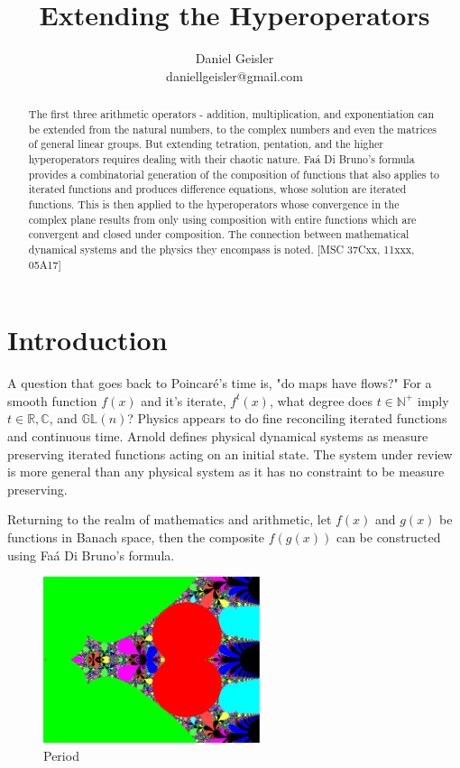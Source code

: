 \documentclass{article}
\theoremstyle{definition}
\begin{document}
\title{Extending the Hyperoperators}

\author{Daniel Geisler\\               %
daniellgeisler@gmail.com}                    

\maketitle

\begin{abstract}
  The first three arithmetic operators - addition, multiplication, and exponentiation can be extended from the natural numbers, to the complex numbers and even the matrices of general linear groups. But extending tetration, pentation, and the higher hyperoperators requires dealing with their chaotic nature. Fa\'a Di Bruno's formula provides a combinatorial generation of the composition of functions that also applies to iterated functions and produces difference equations, whose solution are iterated functions. This is then applied to the hyperoperators whose convergence in the complex plane results from only using composition with entire functions which are convergent and closed under composition. The connection between mathematical dynamical systems and the physics they encompass is noted. [MSC 37Cxx, 11xxx, 05A17]
\end{abstract}

\section{Introduction}
A question that goes back to Poincar\'e's time is, "do maps have flows?" For a smooth function $f(x)$ and it's iterate, $f^t(x)$, what degree does $t \in \mathbb{N^+}$ imply $t \in  \mathbb{R}, \mathbb{C}$, and $\mathbb{GL}(n)$? Physics appears to do fine reconciling iterated functions and continuous time. Arnold \cite{Jackson} defines physical dynamical systems as measure preserving iterated functions acting on an initial state. The system under review is more general than any physical system as it has no constraint to be measure preserving. 

Returning to the realm of mathematics and arithmetic, let $f(x)$ and $g(x)$ be functions in Banach space, then the composite $f(g(x))$ can be constructed using Fa\'a Di Bruno's formula.

\begin{figure}
    \centering
    \includegraphics[width=2.5in]{Period.eps}
    \caption{Period}
    \label{fig:Period}
\end{figure}
\end{document}
